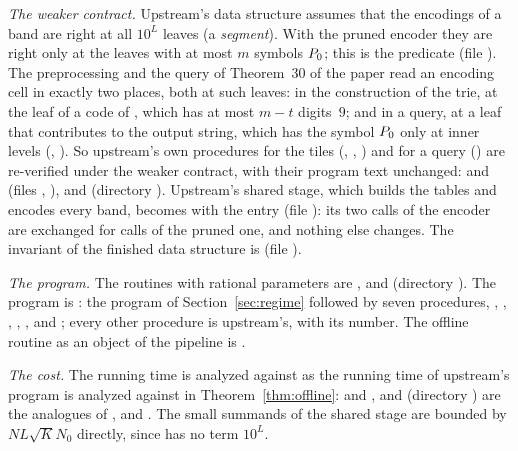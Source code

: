 \emph{The weaker contract.}  Upstream's data structure assumes that the
encodings of a band are right at all \(10^{L}\) leaves (a \emph{segment}).
With the pruned encoder they are right only at the leaves with at most \(m\)
symbols \(P_{0}\); this is the predicate  (file
).  The preprocessing and the query of
Theorem~30 of the paper read an encoding cell in exactly two places, both at
such leaves: in the construction of the trie, at the leaf of a code of
, which has at most \(m-t\) digits~\(9\); and in a query, at a
leaf that contributes to the output string, which has the symbol \(P_{0}\) only
at inner levels (,
).  So upstream's own procedures for the
tiles (, , ) and for a query
() are re-verified under the weaker contract, with their program
text unchanged:  and  (files
, ),
 and  (directory
).  Upstream's shared stage, which builds the
tables and encodes every band, becomes  with the entry
 (file ): its two
calls of the encoder are exchanged for calls of the pruned one, and nothing
else changes.  The invariant of the finished data structure is 
(file ).

\emph{The program.}  The routines with rational parameters are
,  and 
(directory ).  The program is : the
program  of Section~\ref{sec:regime} followed by seven
procedures, , , ,
, ,  and ; every other
procedure is upstream's, with its number.  The offline routine as an object of
the pipeline is .

\emph{The cost.}  The running time is analyzed against  as the
running time of upstream's program is analyzed against  in
Theorem~\ref{thm:offline}:  and ,
 and  (directory ) are
the analogues of ,  and
.  The small summands of the shared stage are bounded by
\(NL\sqrt K N_0\) directly, since  has no term \(10^{L}\).

